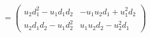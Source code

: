 \begin{equation}
~~=\left( \begin{array}{cc}
u_2 d_1^2 - u_1 d_1 d_2  & -u_1 u_2 d_1 + u_1^2 d_2   \\
u_2 d_1 d_2 - u_1 d_2^2  & u_1 u_2 d_2 - u_2^2 d_1
\end{array}  \right)   \label{eq:centrali}
\end{equation}

